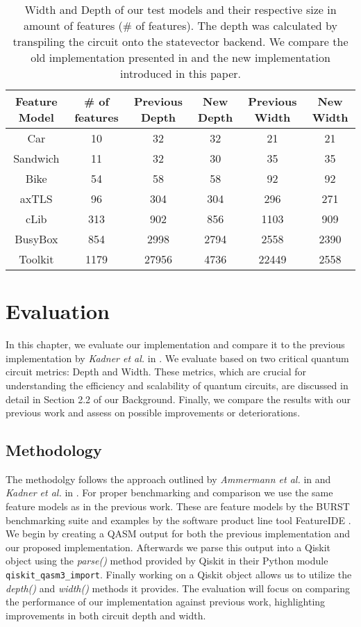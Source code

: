 \begin{table*}
    \centering
    \begin{tabular}{c|c||c|c||c|c}
        Feature Model & \# of features & Previous Depth & New Depth & Previous Width & New Width\\
        \hline \hline
        Car & 10 & 32 & 32 & 21 & 21 \\
        Sandwich & 11 & 32 & 30 & 35 & 35\\
        Bike & 54 & 58 & 58 & 92 & 92\\
        axTLS & 96 & 304 & 304 & 296 & 271\\
        cLib & 313 & 902 & 856 & 1103 & 909\\
        BusyBox & 854 & 2998 & 2794 & 2558 & 2390 \\
        Toolkit & 1179 & 27956 & 4736 & 22449 & 2558
    \end{tabular}
    \caption{Width and Depth of our test models and their respective size in amount of features (\# of features). The depth was calculated by transpiling the circuit onto the statevector backend. We compare the old implementation presented in \cite{thesis-marwin-kadner} and the new implementation introduced in this paper.}
    \label{tab:eval:depth-width}
\end{table*}

\section{Evaluation}
In this chapter, we evaluate our implementation and compare it to the previous implementation by \textit{Kadner et al.} in \cite{thesis-marwin-kadner}.
We evaluate based on two critical quantum circuit metrics: Depth and Width.
These metrics, which are crucial for understanding the efficiency and scalability of quantum circuits, are discussed in detail in Section 2.2 of our Background.
Finally, we compare the results with our previous work \cite{thesis-marwin-kadner} and assess on possible improvements or deteriorations.

\subsection{Methodology}
The methodolgy follows the approach outlined by \textit{Ammermann et al.} in \cite{ammermann2023quantumcomputingimproveuniform} and \textit{Kadner et al.} in \cite{thesis-marwin-kadner}.
For proper benchmarking and comparison we use the same feature models as in the previous work.
These are feature models by the BURST benchmarking suite \cite{burst-suite} and examples by the software product line tool FeatureIDE \cite{feature_ide}.
We begin by creating a QASM output for both the previous implementation and our proposed implementation.
Afterwards we parse this output into a Qiskit object using the \textit{parse()} method provided by Qiskit in their Python module \texttt{qiskit\_qasm3\_import}.
Finally working on a Qiskit object allows us to utilize the \textit{depth()} and \textit{width()} methods it provides.
The evaluation will focus on comparing the performance of our implementation against previous work, highlighting improvements in both circuit depth and width.


